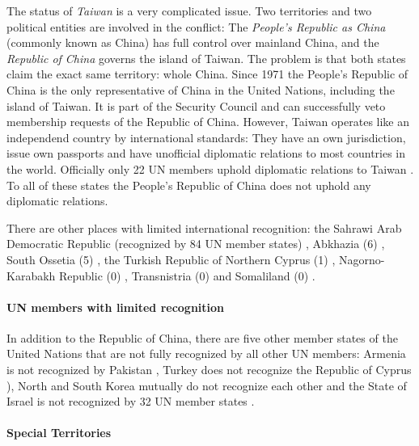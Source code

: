 The status of \emph{Taiwan} is a very complicated issue. Two territories and two political entities are involved in the conflict: The \emph{People's Republic as China} (commonly known as China) has full control over mainland China, and the \emph{Republic of China} governs the island of Taiwan. The problem is that both states claim the exact same territory: whole China. Since 1971 the People's Republic of China is the only representative of China in the United Nations, including the island of Taiwan. It is part of the Security Council and can successfully veto membership requests of the Republic of China. However, Taiwan operates like an independend country by international standards: They have an own jurisdiction, issue own passports and have unofficial diplomatic relations to most countries in the world. Officially only 22 UN members uphold diplomatic relations to Taiwan \cite{TaiwanRecognition}. To all of these states the People's Republic of China does not uphold any diplomatic relations.

There are other places with limited international recognition: the Sahrawi Arab Democratic Republic (recognized by 84 UN member states) \cite{WesternSaharaRecognition}, Abkhazia (6) \cite{AbkhaziaRecognition}, South Ossetia (5) \cite{SouthOssetiaRecognition}, the Turkish Republic of Northern Cyprus (1) \cite{NorthernCyprusRecognition}, Nagorno-Karabakh Republic (0) \cite{NagornoRecognition}, Transnistria (0) \cite{TransnistriaRecognition} and Somaliland (0) \cite{SomalilandRecognition}.


\paragraph{UN members with limited recognition} %
\label{par:un_members_with_limited_recognition}

In addition to the Republic of China, there are five other member states of the United Nations that are not fully recognized by all other UN members: Armenia is not recognized by Pakistan \cite{ArmeniaRecognition}, Turkey does not recognize the Republic of Cyprus \cite{CyprusRecognition}), North and South Korea mutually do not recognize each other \cite{KoreaRecognition} and the State of Israel is not recognized by 32 UN member states \cite{IsraelRecognition}.


\paragraph{Special Territories} %
\label{par:special_territories}

